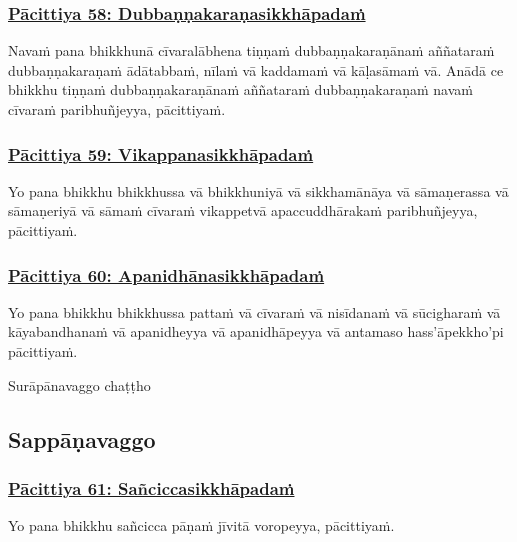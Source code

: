 \subsubsection*{\hyperref[exp58]{Pācittiya 58: Dubbaṇṇakaraṇasikkhāpadaṁ}}
\label{pac58}

Navaṁ pana bhikkhunā cīvaralābhena tiṇṇaṁ dubbaṇṇakaraṇānaṁ aññataraṁ dubbaṇṇakaraṇaṁ ādātabbaṁ, nīlaṁ vā kaddamaṁ vā kāḷasāmaṁ vā. Anādā ce bhikkhu tiṇṇaṁ dubbaṇṇakaraṇānaṁ aññataraṁ dubbaṇṇakaraṇaṁ navaṁ cīvaraṁ paribhuñjeyya, pācittiyaṁ.



\subsubsection*{\hyperref[exp59]{Pācittiya 59: Vikappanasikkhāpadaṁ}}
\label{pac59}

Yo pana bhikkhu bhikkhussa vā bhikkhuniyā vā sikkhamānāya vā sāmaṇerassa vā sāmaṇeriyā vā sāmaṁ cīvaraṁ vikappetvā apaccuddhārakaṁ paribhuñjeyya, pācittiyaṁ.



\subsubsection*{\hyperref[exp60]{Pācittiya 60: Apanidhānasikkhāpadaṁ}}
\label{pac60}

Yo pana bhikkhu bhikkhussa pattaṁ vā cīvaraṁ vā nisīdanaṁ vā sūcigharaṁ vā kāyabandhanaṁ vā apanidheyya vā apanidhāpeyya vā antamaso hass'āpekkho'pi pācittiyaṁ.

\begin{center}
	Surāpānavaggo chaṭṭho
\end{center}



\subsection{Sappāṇavaggo}

\subsubsection*{\hyperref[exp61]{Pācittiya 61: Sañciccasikkhāpadaṁ}}
\label{pac61}

Yo pana bhikkhu sañcicca pāṇaṁ jīvitā voropeyya, pācittiyaṁ.



